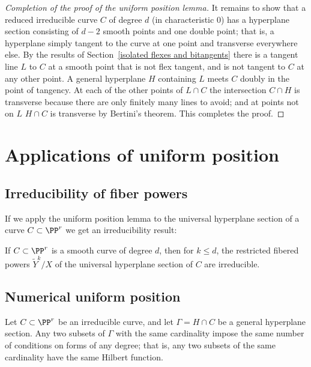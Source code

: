 \begin{proof}[Completion of the proof of the uniform position lemma]
 It remains to show that a reduced irreducible curve $C$ of degree $d$ (in characteristic 0)
 has a hyperplane section consisting of $d-2$ smooth points and one double point; that is, a hyperplane simply tangent to the curve at one point and transverse everywhere else. By the results of 
 Section~\ref{isolated flexes and bitangents} there is a tangent line $L$ to $C$ at a smooth point that is not flex tangent, and is not tangent to $C$ at any other point. A general hyperplane $H$ containing $L$ meets $C$ doubly in the point of
 tangency. At each of the other points of $L\cap C$ the intersection $C\cap H$ is transverse because there are only finitely many lines to avoid; and at points not on $L$ $H\cap C$ is transverse by Bertini's theorem. This completes the proof.
\end{proof}

 \section{Applications of uniform position}
\subsection{Irreducibility of fiber powers}
If we apply the uniform position lemma to the universal hyperplane section of a curve $C \subset \PP^r$ we get an irreducibility result:

\begin{corollary}\label{hyperplane section monodromy} If $C\subset \PP^r$ is a smooth curve of degree $d$, then 
for $k\leq d$, the restricted fibered powers $\tilde Y^k/X$  of the universal hyperplane section 
of $C$ are irreducible.
\end{corollary}

\subsection{Numerical uniform position}
\begin{corollary}\label{numerical uniform position lemma}
Let $C\subset \PP^r$ be an irreducible curve, and let $\Gamma = H\cap C$ be a general hyperplane section. Any two subsets of $\Gamma$ with the same cardinality impose the same number of conditions on forms of any degree; that is, any two subsets of the same cardinality have the same Hilbert function.
\end{corollary}


